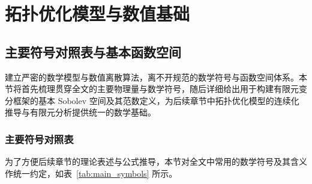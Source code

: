 \chapter{拓扑优化模型与数值基础}
\label{chap:top_models_numerics}


\section{主要符号对照表与基本函数空间}
\label{sec:notation_spaces}

建立严密的数学模型与数值离散算法，离不开规范的数学符号与函数空间体系。本节将首先梳理贯穿全文的主要物理量与数学符号，随后详细给出用于构建有限元变分框架的基本 Sobolev 空间及其范数定义，为后续章节中拓扑优化模型的连续化推导与有限元分析提供统一的数学基础。


\subsection{主要符号对照表}
\label{subsec:notation_table}

为了方便后续章节的理论表述与公式推导，本节对全文中常用的数学符号及其含义作统一约定，如表~\ref{tab:main_symbols} 所示。

